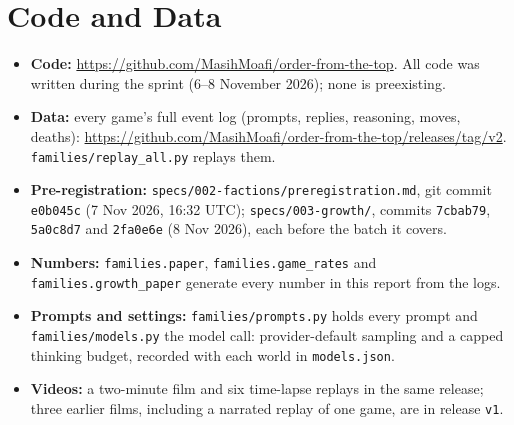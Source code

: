 \section*{Code and Data}
\begin{itemize}
  \item \textbf{Code:} \url{https://github.com/MasihMoafi/order-from-the-top}. All code was
  written during the sprint (6--8 November 2026); none is preexisting.
  \item \textbf{Data:} every game's full event log (prompts, replies, reasoning, moves,
  deaths): \url{https://github.com/MasihMoafi/order-from-the-top/releases/tag/v2}.
  \texttt{families/replay\_all.py} replays them.
  \item \textbf{Pre-registration:} \texttt{specs/002-factions/preregistration.md}, git
  commit \texttt{e0b045c} (7 Nov 2026, 16:32 UTC); \texttt{specs/003-growth/}, commits
  \texttt{7cbab79}, \texttt{5a0c8d7} and \texttt{2fa0e6e} (8 Nov 2026), each before the
  batch it covers.
  \item \textbf{Numbers:} \texttt{families.paper}, \texttt{families.game\_rates} and
  \texttt{families.growth\_paper} generate every number in this report from the logs.
  \item \textbf{Prompts and settings:} \texttt{families/prompts.py} holds every prompt and \texttt{families/models.py} the model call: provider-default sampling and a capped thinking budget, recorded with each world in \texttt{models.json}.
  \item \textbf{Videos:} a two-minute film and six time-lapse replays in the same release; three earlier films, including a narrated replay of one game, are in release \texttt{v1}.
\end{itemize}
